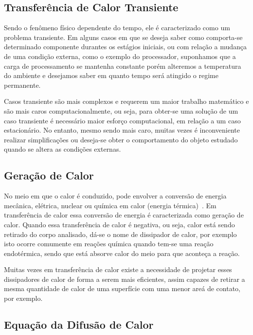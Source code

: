 \documentclass[
	12pt,				  %
	openright,		%
	twoside,			%
	a4paper,			%
	chapter=TITLE,		    %
	english,			%
	brazil				%
	]{abntex2}
\begin{document}
\subsection{Transferência de Calor Transiente}\label{sec:transiente}

Sendo o fenômeno físico dependente do tempo, ele é caracterizado como um
problema transiente. Em alguns casos em que se deseja saber como comporta-se
determinado componente durantes os estágios iniciais, ou com relação a mudança
de uma condição externa, como o exemplo do processador, suponhamos que a carga
de processamento se mantenha constante porém alteremos a temperatura do
ambiente e desejamos saber em quanto tempo será atingido o regime permanente.

Casos transiente são mais complexos e requerem um maior trabalho matemático e
são mais caros computacionalmente, ou seja, para obter-se uma solução de um
caso transiente é necessário maior esforço computacional, em relação a um
caso estacionário. No entanto, mesmo sendo mais caro, muitas vezes é
inconveniente realizar simplificações ou deseja-se obter o comportamento do
objeto estudado quando se altera as condições externas.

\subsection{Geração de Calor}\label{sec:geracaodecalor}

No meio em que o calor é conduzido, pode envolver a conversão de energia
mecânica, elétrica, nuclear ou química em calor (energia
térmica)~\cite{cengel2015}. Em transferência de calor essa conversão de energia
é caracterizada como geração de calor. Quando essa transferência de calor é
negativa, ou seja, calor está sendo retirado do corpo analisado, dá-se o nome
de dissipador de calor, por exemplo isto ocorre comumente em reações química
quando tem-se uma reação endotérmica, sendo que está absorve calor do meio para
que aconteça a reação.

Muitas vezes em transferência de calor existe a necessidade de projetar esses
dissipadores de calor de forma a serem mais eficientes, assim capazes de
retirar a mesma quantidade de calor de uma superfície com uma menor areá de
contato, por exemplo.

\subsection{Equação da Difusão de Calor}\label{sec:difcalor}
\end{document}
